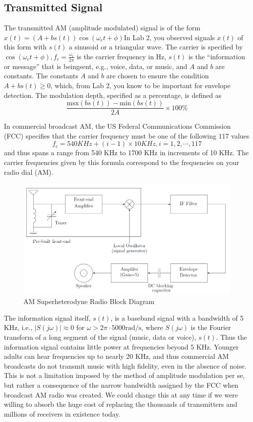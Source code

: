 \documentclass[12pt]{article}
\begin{document}
\subsection{Transmitted Signal}
The transmitted AM (amplitude modulated) signal is of the form $x(t)=(A+bs(t))\cos(\omega_ct+\phi)$In Lab
2, you observed signals $x(t)$ of this form with $s(t)$ a sinusoid or a triangular wave. The carrier is specified
by $\cos(\omega_ct+\phi),f_c=\frac{\omega_c}{2\pi}$ is the carrier frequency in Hz, $s(t)$ is the “information or message” that is beingsent, e.g., voice, data, or music, and $A$ and $b$ are constants. The constants $A$ and $b$ are chosen to ensure
the condition $A+bs(t)\ge0$, which, from Lab 2, you know to be important for envelope detection. The
modulation depth, specified as a percentage, is defined as
\begin{equation}
\frac{\text{msx}(bs(t))-\text{min}(bs(t))}{2A}\times 100\%
\end{equation}
\par In commercial broadcast AM, the US Federal Communications Commission (FCC) specifies that the
carrier frequency must be one of the following 117 values
\begin{equation}
f_c=540KHz+(i-1)\times 10KHz,i=1,2,\cdots,117
\end{equation}
and thus spans a range from 540 KHz to 1700 KHz in increments of 10 KHz. The carrier frequencies given
by this formula correspond to the frequencies on your radio dial (AM).
\begin{figure}[H]
\centering
\includegraphics[scale=0.3]{P1.jpg}
\caption{AM Superheterodyne Radio Block Diagram}
\end{figure}
The information signal itself, $s(t)$, is a baseband signal with a bandwidth of 5 KHz, i.e., $|S(j\omega)|\approx0$ for
$\omega>2\pi\cdot 5000 \text{rad/s}$, where $S(j\omega)$ is the Fourier transform of a long segment of the signal (music, data or voice), $s(t)$. Thus the information signal contains little power at frequencies beyond 5 KHz. Younger adults
can hear frequencies up to nearly 20 KHz, and thus commercial AM broadcasts do not transmit music with
high fidelity, even in the absence of noise. This is not a limitation imposed by the method of amplitude
modulation per se, but rather a consequence of the narrow bandwidth assigned by the FCC when broadcast
AM radio was created. We could change this at any time if we were willing to absorb the huge cost of
replacing the thousands of transmitters and millions of receivers in existence today.
\end{document}
